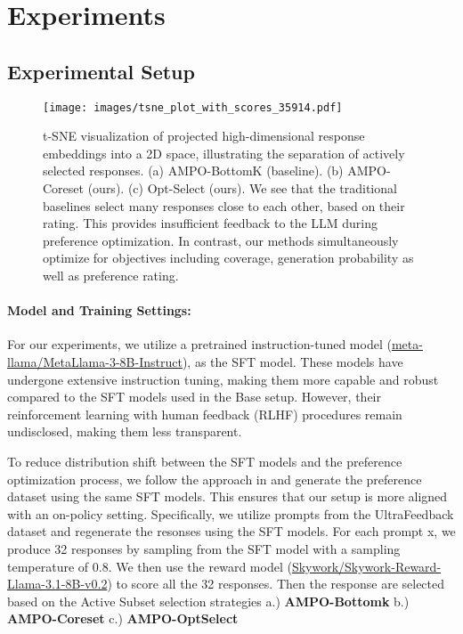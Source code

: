 
\section{Experiments}

\subsection{Experimental Setup}
\label{sec:experimental setup}


\begin{figure*}[!t]
    \centering
    \texttt{[image: images/tsne\_plot\_with\_scores\_35914.pdf]}
    \vspace{-0.25in}
    \caption{t-SNE visualization of projected high-dimensional response embeddings into a 2D space, illustrating the separation of actively selected responses. (a) AMPO-BottomK (baseline). (b) AMPO-Coreset (ours). (c) Opt-Select (ours). We see that the traditional baselines select many responses close to each other, based on their rating. This provides insufficient feedback to the LLM during preference optimization. In contrast, our methods simultaneously optimize for objectives including coverage, generation probability as well as preference rating.}
\label{fig:tsne_analysis}
\end{figure*}





\paragraph{Model and Training Settings:}
For our experiments, we utilize a pretrained instruction-tuned model (\href{https://huggingface.co/meta-llama/Meta-Llama-3-8B-Instruct}{meta-llama/MetaLlama-3-8B-Instruct}), as the SFT model. These models have undergone extensive instruction tuning, making them more capable and robust compared to the SFT models used in the Base setup. However, their reinforcement learning with human feedback (RLHF) procedures remain undisclosed, making them less transparent.

To reduce distribution shift between the SFT models and the preference optimization process, we follow the approach in \cite{tran2023iterative}  and generate the preference dataset using the same SFT models. This ensures that our setup is more aligned with an on-policy setting. Specifically, we utilize prompts from the UltraFeedback dataset \cite{cui2023ultrafeedback} and regenerate the resonses using the SFT models. For each prompt x, we produce 32 responses by sampling from the SFT model with a sampling temperature of 0.8. We then use the reward model (\href{https://huggingface.co/Skywork/Skywork-Reward-Llama-3.1-8B-v0.2}{Skywork/Skywork-Reward-Llama-3.1-8B-v0.2}) \cite{liu2024skywork} to score all the 32 responses. Then the response are selected based on the Active Subset selection strategies a.) \textbf{AMPO-Bottomk} b.) \textbf{AMPO-Coreset} c.) \textbf{AMPO-OptSelect}

